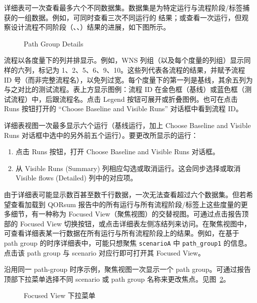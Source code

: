 详细表可一次查看最多六个不同数据集。数据集是为特定运行与流程阶段/标签捕获的一组数据。例如，可同时查看三次不同运行的  结果；或查看一次运行，但观察设计流程不同阶段（、、）结果的进展，如下图所示。

\begin{figure}[htbp]
\centering
{}
\caption{Path Group Details}
\label{fig:path-group-details}
\end{figure}

流程以各度量下的列并排显示。例如，WNS 列组（以及每个度量的列组）显示同样的六列，标记为 1、2、5、6、9、10。这些列代表各流程的结果，并赋予流程 ID 号（而非完整流程名），以免列过宽。每个度量下的第一列是基线，其余五列为与之对比的测试流程。表上方显示图例：流程 ID 在金色框（基线）或蓝色框（测试流程）中，后跟流程名。点击 Legend 按钮可展开或折叠图例。也可在点击 Runs 按钮打开的 “Choose Baseline and Visible Runs” 对话框中看到流程 ID。

详细表视图一次最多显示六个运行（基线运行，加上 Choose Baseline and Visible Runs 对话框中选中的另外前五个运行）。要更改所显示的运行：
\begin{enumerate}
  \item 点击 Runs 按钮，打开 Choose Baseline and Visible Runs 对话框。
  \item 从 Visible Runs (Summary) 列相应勾选或取消运行。这会同步选择或取消 Visible flows (Detailed) 列中的对应项。
\end{enumerate}

由于详细表可能显示数百甚至数千行数据，一次无法查看超过六个数据集。但若希望查看加载到 QORsum 报告中的所有运行与所有流程阶段/标签上这些度量的更多细节，有一种称为 Focused View（聚焦视图）的交替视图。可通过点击报告顶部的 Focused View 切换按钮，或点击详细表左侧冻结列来访问。在聚焦视图中，可查看详细表某一行数据在所有运行与所有流程阶段上的结果。例如，在基于 path group 的时序详细表中，可能只想聚焦 \texttt{scenarioA} 中 \texttt{path\_group1} 的信息。点击该 path group 与 scenario 对应行即可打开其 Focused View。

沿用同一 path-group 时序示例，聚焦视图一次显示一个 path group。可通过报告顶部下拉菜单选择不同 scenario 或 path group 名称来更改焦点。见图~\ref{fig:focused-view}。

\begin{figure}[htbp]
\centering
{}
\caption{Focused View 下拉菜单}
\label{fig:focused-view}
\end{figure}


